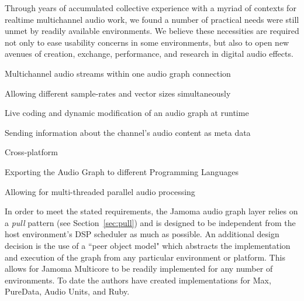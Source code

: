 \documentclass[twoside,a4paper]{article}
\newenvironment{packed_item}{
\begin{itemize}
  \setlength{\itemsep}{1pt}
  \setlength{\parskip}{0pt}
  \setlength{\parsep}{0pt}
}{\end{itemize}}
\begin{document}
Through years of accumulated collective experience with a myriad of contexts for realtime multichannel audio work, we found a number of practical needs were still unmet by readily available environments.  We believe these necessities are required not only to ease usability concerns in some environments, but also to open new avenues of creation, exchange, performance, and research in digital audio effects.

\begin{packed_item}

\item{Multichannel audio streams within one audio graph connection}
\item{Allowing different sample-rates and vector sizes simultaneously}  
\item{Live coding and dynamic modification of an audio graph at runtime}    
\item{Sending information about the channel's audio content as meta data}  
\item{Cross-platform}
\item{Exporting the Audio Graph to different Programming Languages}
\item{Allowing for multi-threaded parallel audio processing}
 
\end{packed_item}	


In order to meet the stated requirements, the Jamoma audio graph layer relies on a \emph{pull} pattern (see Section~\ref{sec:pull}) and is designed to be independent from the host environment's DSP scheduler as much as possible.
An additional design decision is the use of a ``peer object model" which abstracts the implementation and execution of the graph from any particular environment or platform.  
This allows for Jamoma Multicore to be readily implemented for any number of environments.  
To date the authors have created implementations for Max, PureData, Audio Units, and Ruby.
\end{document}
